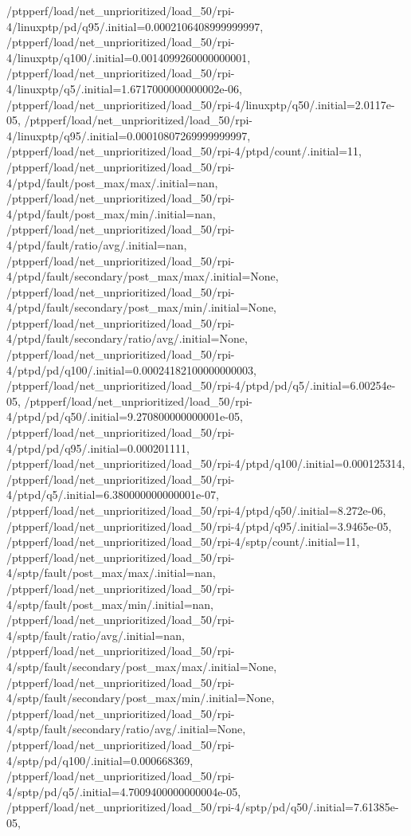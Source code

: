 {    /ptpperf/load/net_unprioritized/load_50/rpi-4/linuxptp/pd/q95/.initial=0.0002106408999999997,
    /ptpperf/load/net_unprioritized/load_50/rpi-4/linuxptp/q100/.initial=0.0014099260000000001,
    /ptpperf/load/net_unprioritized/load_50/rpi-4/linuxptp/q5/.initial=1.6717000000000002e-06,
    /ptpperf/load/net_unprioritized/load_50/rpi-4/linuxptp/q50/.initial=2.0117e-05,
    /ptpperf/load/net_unprioritized/load_50/rpi-4/linuxptp/q95/.initial=0.00010807269999999997,
    /ptpperf/load/net_unprioritized/load_50/rpi-4/ptpd/count/.initial=11,
    /ptpperf/load/net_unprioritized/load_50/rpi-4/ptpd/fault/post_max/max/.initial=nan,
    /ptpperf/load/net_unprioritized/load_50/rpi-4/ptpd/fault/post_max/min/.initial=nan,
    /ptpperf/load/net_unprioritized/load_50/rpi-4/ptpd/fault/ratio/avg/.initial=nan,
    /ptpperf/load/net_unprioritized/load_50/rpi-4/ptpd/fault/secondary/post_max/max/.initial=None,
    /ptpperf/load/net_unprioritized/load_50/rpi-4/ptpd/fault/secondary/post_max/min/.initial=None,
    /ptpperf/load/net_unprioritized/load_50/rpi-4/ptpd/fault/secondary/ratio/avg/.initial=None,
    /ptpperf/load/net_unprioritized/load_50/rpi-4/ptpd/pd/q100/.initial=0.00024182100000000003,
    /ptpperf/load/net_unprioritized/load_50/rpi-4/ptpd/pd/q5/.initial=6.00254e-05,
    /ptpperf/load/net_unprioritized/load_50/rpi-4/ptpd/pd/q50/.initial=9.270800000000001e-05,
    /ptpperf/load/net_unprioritized/load_50/rpi-4/ptpd/pd/q95/.initial=0.000201111,
    /ptpperf/load/net_unprioritized/load_50/rpi-4/ptpd/q100/.initial=0.000125314,
    /ptpperf/load/net_unprioritized/load_50/rpi-4/ptpd/q5/.initial=6.380000000000001e-07,
    /ptpperf/load/net_unprioritized/load_50/rpi-4/ptpd/q50/.initial=8.272e-06,
    /ptpperf/load/net_unprioritized/load_50/rpi-4/ptpd/q95/.initial=3.9465e-05,
    /ptpperf/load/net_unprioritized/load_50/rpi-4/sptp/count/.initial=11,
    /ptpperf/load/net_unprioritized/load_50/rpi-4/sptp/fault/post_max/max/.initial=nan,
    /ptpperf/load/net_unprioritized/load_50/rpi-4/sptp/fault/post_max/min/.initial=nan,
    /ptpperf/load/net_unprioritized/load_50/rpi-4/sptp/fault/ratio/avg/.initial=nan,
    /ptpperf/load/net_unprioritized/load_50/rpi-4/sptp/fault/secondary/post_max/max/.initial=None,
    /ptpperf/load/net_unprioritized/load_50/rpi-4/sptp/fault/secondary/post_max/min/.initial=None,
    /ptpperf/load/net_unprioritized/load_50/rpi-4/sptp/fault/secondary/ratio/avg/.initial=None,
    /ptpperf/load/net_unprioritized/load_50/rpi-4/sptp/pd/q100/.initial=0.000668369,
    /ptpperf/load/net_unprioritized/load_50/rpi-4/sptp/pd/q5/.initial=4.7009400000000004e-05,
    /ptpperf/load/net_unprioritized/load_50/rpi-4/sptp/pd/q50/.initial=7.61385e-05,
}
